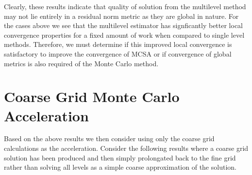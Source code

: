 \documentclass[note]{TechNote}
\begin{document}
Clearly, these results indicate that quality of solution from the
multilevel method may not lie entirely in a residual norm metric as
they are global in nature. For the cases above we see that the
multilevel estimator has signficantly better local convergence
properties for a fixed amount of work when compared to single level
methods. Therefore, we must determine if this improved local
convergence is satisfactory to improve the convergence of MCSA or if
convergence of global metrics is also required of the Monte Carlo
method.

\section{Coarse Grid Monte Carlo Acceleration}
Based on the above results we then consider using only the coarse grid
calculations as the acceleration. Consider the following results where
a coarse grid solution has been produced and then simply prolongated
back to the fine grid rather than solving all levels as a simple
coarse approximation of the solution.

\clearpage




\closing
\caution
\end{document}
